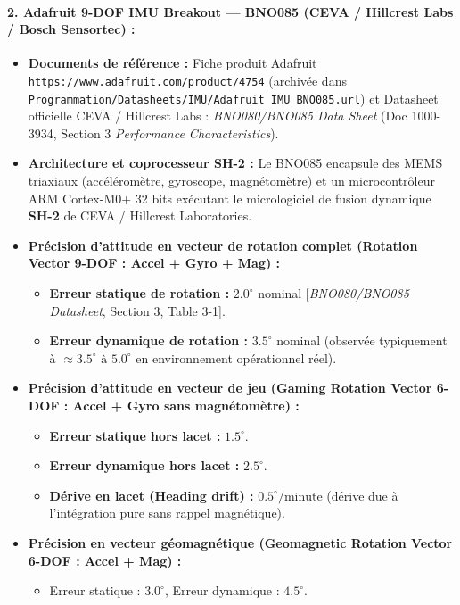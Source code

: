 \documentclass[../Formulations_Kalman.tex]{subfiles}
\begin{document}
\paragraph{2. Adafruit 9-DOF IMU Breakout — BNO085 (CEVA / Hillcrest Labs / Bosch Sensortec) :}
\begin{itemize}
    \item \textbf{Documents de référence :} Fiche produit Adafruit \texttt{https://www.adafruit.com/product/4754} (archivée dans \texttt{Programmation/Datasheets/IMU/Adafruit IMU BNO085.url}) et Datasheet officielle CEVA / Hillcrest Labs : \textit{BNO080/BNO085 Data Sheet} (Doc 1000-3934, Section 3 \textit{Performance Characteristics}).
    \item \textbf{Architecture et coprocesseur SH-2 :} Le BNO085 encapsule des MEMS triaxiaux (accéléromètre, gyroscope, magnétomètre) et un microcontrôleur ARM Cortex-M0+ 32 bits exécutant le micrologiciel de fusion dynamique \textbf{SH-2} de CEVA / Hillcrest Laboratories.
    \item \textbf{Précision d'attitude en vecteur de rotation complet (Rotation Vector 9-DOF : Accel + Gyro + Mag) :}
    \begin{itemize}
        \item \textbf{Erreur statique de rotation :} $2.0^\circ$ nominal [\textit{BNO080/BNO085 Datasheet}, Section 3, Table 3-1].
        \item \textbf{Erreur dynamique de rotation :} $3.5^\circ$ nominal (observée typiquement à $\approx 3.5^\circ \text{ à } 5.0^\circ$ en environnement opérationnel réel).
    \end{itemize}
    \item \textbf{Précision d'attitude en vecteur de jeu (Gaming Rotation Vector 6-DOF : Accel + Gyro sans magnétomètre) :}
    \begin{itemize}
        \item \textbf{Erreur statique hors lacet :} $1.5^\circ$.
        \item \textbf{Erreur dynamique hors lacet :} $2.5^\circ$.
        \item \textbf{Dérive en lacet (Heading drift) :} $0.5^\circ/\text{minute}$ (dérive due à l'intégration pure sans rappel magnétique).
    \end{itemize}
    \item \textbf{Précision en vecteur géomagnétique (Geomagnetic Rotation Vector 6-DOF : Accel + Mag) :}
    \begin{itemize}
        \item Erreur statique : $3.0^\circ$, Erreur dynamique : $4.5^\circ$.

\end{itemize}
\end{itemize}
\end{document}

